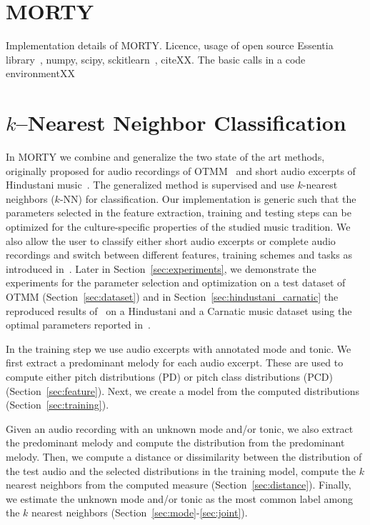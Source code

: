 \documentclass{sig-alternate}
\begin{document}
\section{MORTY}\label{sec:morty}
Implementation details of MORTY. Licence, usage of open source Essentia library~\cite{bogdanov2013essentia}, numpy, scipy, sckitlearn~\cite{scikit-learn}, citeXX. The basic calls in a code environmentXX

\section{\MakeLowercase{$k$}--Nearest Neighbor Classification}\label{sec:methodology}

In MORTY we combine and generalize the two state of the art methods, originally proposed for audio recordings of OTMM~\cite{bozkurt_makam} and short audio excerpts of Hindustani music~\cite{chordia}. The generalized method is supervised and use $k$-nearest neighbors ($k$-NN) for classification. Our implementation is generic such that the parameters selected in the feature extraction, training and testing steps can be optimized for the culture-specific properties of the studied music tradition. We also allow the user to classify either short audio excerpts or complete audio recordings and switch between different features, training schemes and tasks as introduced in~\cite{bozkurt_makam, chordia}. Later in Section~\ref{sec:experiments}, we demonstrate the experiments for the parameter selection and optimization on a test dataset of OTMM (Section~\ref{sec:dataset}) and in Section~\ref{sec:hindustani_carnatic} the reproduced results of~\cite{chordia} on a Hindustani and a Carnatic music dataset using the optimal parameters reported in~\cite{chordia}.

In the training step we use audio excerpts with annotated mode and tonic. We first extract a predominant me\-lody for each audio excerpt. These are used to compute either pitch distributions (PD) or pitch class distributions (PCD) (Section~\ref{sec:feature}). Next, we create a model from the computed distributions (Section~\ref{sec:training}). 

Given an audio recording with an unknown mode and/or tonic, we also extract the predominant melody and compute the distribution from the predominant melody. Then, we compute a distance or dissimilarity between the distribution of the test audio and the selected distributions in the training model, compute the $k$ nearest neighbors from the computed measure (Section~\ref{sec:distance}). Finally, we estimate the unknown mode and/or tonic as the most common label among the $k$ nearest neighbors (Section~\ref{sec:mode}-\ref{sec:joint}).
\end{document}
